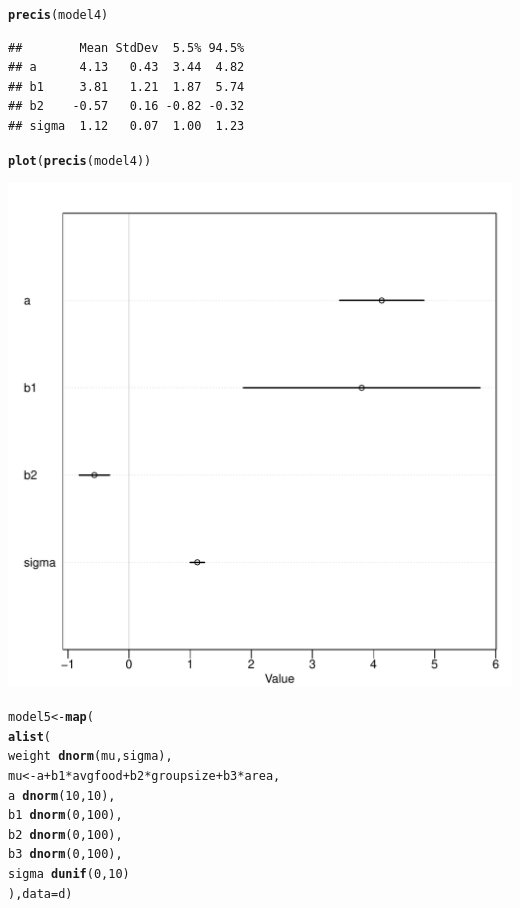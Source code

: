 \documentclass[12pt]{article}\usepackage[]{graphicx}\usepackage[]{color}
\makeatletter
\def\maxwidth{ %
  \ifdim\Gin@nat@width>\linewidth
    \linewidth
  \else
    \Gin@nat@width
  \fi
}
\newcommand{\hlnum}[1]{\textcolor[rgb]{0.686,0.059,0.569}{#1}}%
\newcommand{\hlopt}[1]{\textcolor[rgb]{0,0,0}{#1}}%
\newcommand{\hlstd}[1]{\textcolor[rgb]{0.345,0.345,0.345}{#1}}%
\newcommand{\hlkwb}[1]{\textcolor[rgb]{0.69,0.353,0.396}{#1}}%
\newcommand{\hlkwc}[1]{\textcolor[rgb]{0.333,0.667,0.333}{#1}}%
\newcommand{\hlkwd}[1]{\textcolor[rgb]{0.737,0.353,0.396}{\textbf{#1}}}%
\newenvironment{kframe}{%
 \def\at@end@of@kframe{}%
 \ifinner\ifhmode%
  \def\at@end@of@kframe{\end{minipage}}%
  \begin{minipage}{\columnwidth}%
 \fi\fi%
 \def\FrameCommand##1{\hskip\@totalleftmargin \hskip-\fboxsep
 \colorbox{shadecolor}{##1}\hskip-\fboxsep
     \hskip-\linewidth \hskip-\@totalleftmargin \hskip\columnwidth}%
 \MakeFramed {\advance\hsize-\width
   \@totalleftmargin\z@ \linewidth\hsize
   \@setminipage}}%
 {\par\unskip\endMakeFramed%
 \at@end@of@kframe}
\newenvironment{knitrout}{}{} %
\makeatother
\begin{document}
\begin{knitrout}
\begin{kframe}
\begin{alltt}
\hlkwd{precis}\hlstd{(model4)}
\end{alltt}
\begin{verbatim}
##        Mean StdDev  5.5% 94.5%
## a      4.13   0.43  3.44  4.82
## b1     3.81   1.21  1.87  5.74
## b2    -0.57   0.16 -0.82 -0.32
## sigma  1.12   0.07  1.00  1.23
\end{verbatim}
\begin{alltt}
\hlkwd{plot}\hlstd{(}\hlkwd{precis}\hlstd{(model4))}
\end{alltt}
\end{kframe}
\includegraphics[width=\maxwidth]{figure/unnamed-chunk-7-1} 
\begin{kframe}\begin{alltt}
\hlstd{model5} \hlkwb{<-} \hlkwd{map}\hlstd{(}
  \hlkwd{alist}\hlstd{(}
    \hlstd{weight} \hlopt{~} \hlkwd{dnorm}\hlstd{(mu, sigma),}
     \hlstd{mu} \hlkwb{<-} \hlstd{a} \hlopt{+} \hlstd{b1} \hlopt{*} \hlstd{avgfood} \hlopt{+} \hlstd{b2} \hlopt{*} \hlstd{groupsize} \hlopt{+} \hlstd{b3} \hlopt{*} \hlstd{area,}
    \hlstd{a} \hlopt{~} \hlkwd{dnorm}\hlstd{(}\hlnum{10}\hlstd{,} \hlnum{10}\hlstd{),}
    \hlstd{b1} \hlopt{~} \hlkwd{dnorm}\hlstd{(}\hlnum{0}\hlstd{,} \hlnum{100}\hlstd{),}
    \hlstd{b2} \hlopt{~} \hlkwd{dnorm}\hlstd{(}\hlnum{0}\hlstd{,} \hlnum{100}\hlstd{),}
    \hlstd{b3} \hlopt{~} \hlkwd{dnorm}\hlstd{(}\hlnum{0}\hlstd{,} \hlnum{100}\hlstd{),}
    \hlstd{sigma} \hlopt{~} \hlkwd{dunif}\hlstd{(}\hlnum{0}\hlstd{,} \hlnum{10}\hlstd{)}
  \hlstd{),} \hlkwc{data} \hlstd{= d)}


\end{alltt}
\end{kframe}
\end{knitrout}
\end{document}
